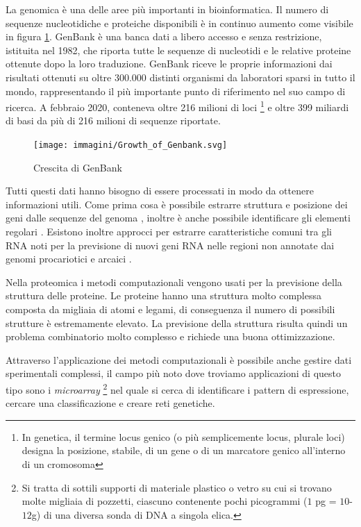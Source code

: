\documentclass[12pt,italian]{report}
\begin{document}
	La genomica è una delle aree più importanti in bioinformatica. Il numero di sequenze nucleotidiche e proteiche disponibili è in continuo aumento come visibile in figura \ref{fig:growthofgenbank}. GenBank è una banca dati a libero accesso e senza restrizione, istituita nel 1982, che riporta tutte le sequenze di nucleotidi e le relative proteine ottenute dopo la loro traduzione. GenBank riceve le proprie informazioni dai risultati ottenuti su oltre 300.000 distinti organismi da laboratori sparsi in tutto il mondo, rappresentando il più importante punto di riferimento nel suo campo di ricerca. A febbraio 2020, conteneva oltre 216 milioni di loci \footnote{In genetica, il termine locus genico (o più semplicemente locus, plurale loci) designa la posizione, stabile, di un gene o di un marcatore genico all'interno di un cromosoma} e oltre 399 miliardi di basi da più di 216 milioni di sequenze riportate.

	\begin{figure}[h]
		\centering
		\texttt{[image: immagini/Growth\_of\_Genbank.svg]}
		\caption{Crescita di GenBank}
		\label{fig:growthofgenbank}
	\end{figure}
	Tutti questi dati hanno bisogno di essere processati in modo da ottenere informazioni utili. Come prima cosa  è possibile estrarre struttura e posizione dei geni dalle sequenze del genoma \cite{Mathe2002-us}, inoltre è anche possibile identificare gli elementi regolari \cite{Aerts2004-jh}. Esistono inoltre approcci per estrarre caratteristiche comuni tra gli RNA noti per la previsione di nuovi geni RNA nelle regioni non annotate dai genomi procariotici e arcaici \cite{Carter2001-oo}.
	
	Nella proteomica i metodi computazionali vengono usati per la previsione della struttura delle proteine. Le proteine hanno una struttura molto complessa composta da migliaia di atomi e legami, di conseguenza il numero di possibili strutture è estremamente elevato. La previsione della struttura risulta quindi un problema combinatorio molto complesso e richiede una buona ottimizzazione.
	
	Attraverso l'applicazione dei metodi computazionali è possibile anche gestire dati sperimentali complessi, il campo più noto dove troviamo applicazioni di questo tipo sono i \textit{microarray} \footnote{Si tratta di sottili supporti di materiale plastico o vetro su cui si trovano molte migliaia di pozzetti, ciascuno contenente pochi picogrammi ($1$ pg = $10$-$12$g) di una diversa sonda di DNA a singola elica.} nel quale si cerca di identificare i pattern di espressione, cercare una classificazione e creare reti genetiche.
	  
\end{document}
